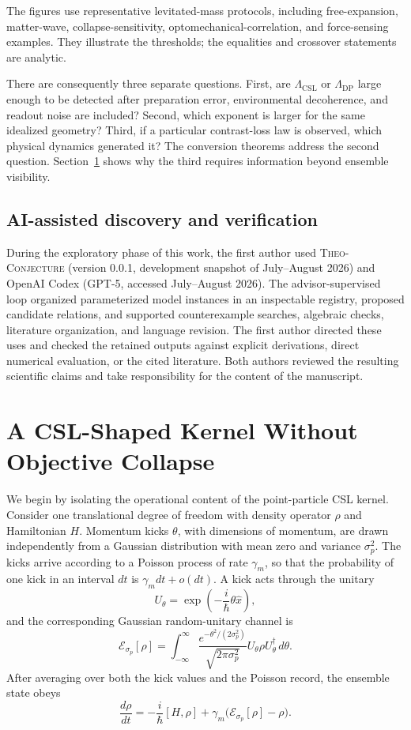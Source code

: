 \documentclass[
  aps,
  prd,
  preprint,
  notitlepage,
  superscriptaddress,
  nofootinbib,
  longbibliography
]{revtex4-2}
\newcommand{\Lcsl}{\Lambda_{\mathrm{CSL}}}
\newcommand{\Ldp}{\Lambda_{\mathrm{DP}}}
\begin{document}
The figures use representative levitated-mass protocols, including free-expansion, matter-wave, collapse-sensitivity, optomechanical-correlation, and force-sensing examples. They illustrate the thresholds; the equalities and crossover statements are analytic.

There are consequently three separate questions. First, are $\Lcsl$ or $\Ldp$ large enough to be detected after preparation error, environmental decoherence, and readout noise are included? Second, which exponent is larger for the same idealized geometry? Third, if a particular contrast-loss law is observed, which physical dynamics generated it? The conversion theorems address the second question. Section~\ref{sec:random-unitary} shows why the third requires information beyond ensemble visibility.

\subsection{AI-assisted discovery and verification}

During the exploratory phase of this work, the first author used
\textsc{Theo-Conjecture} (version 0.0.1, development snapshot of July--August
2026) and OpenAI Codex (GPT-5, accessed July--August 2026). The
advisor-supervised loop organized parameterized model instances in an
inspectable registry, proposed candidate relations, and supported
counterexample searches, algebraic checks, literature organization, and
language revision. The first author directed these uses and checked the
retained outputs against explicit derivations, direct numerical evaluation,
or the cited literature. Both authors reviewed the resulting scientific claims
and take responsibility for the content of the manuscript.

\section{A CSL-Shaped Kernel Without Objective Collapse}
\label{sec:random-unitary}

We begin by isolating the operational content of the point-particle CSL kernel. Consider one translational degree of freedom with density operator $\rho$ and Hamiltonian $H$. Momentum kicks $\theta$, with dimensions of momentum, are drawn independently from a Gaussian distribution with mean zero and variance $\sigma_p^2$. The kicks arrive according to a Poisson process of rate $\gamma_m$, so that the probability of one kick in an interval $dt$ is $\gamma_m dt+o(dt)$. A kick acts through the unitary
\[
U_\theta=\exp\!\left(-\frac{i}{\hbar}\theta\hat x\right),
\]
and the corresponding Gaussian random-unitary channel is
\[
\mathcal E_{\sigma_p}[\rho]
=\int_{-\infty}^{\infty}
\frac{e^{-\theta^2/(2\sigma_p^2)}}{\sqrt{2\pi\sigma_p^2}}
U_\theta\rho U_\theta^\dagger\,d\theta.
\]
After averaging over both the kick values and the Poisson record, the ensemble state obeys
\begin{equation}
\frac{d\rho}{dt}
=-\frac{i}{\hbar}[H,\rho]
+\gamma_m\bigl(\mathcal E_{\sigma_p}[\rho]-\rho\bigr).
\label{eq:random-unitary-master}
\end{equation}
\end{document}

